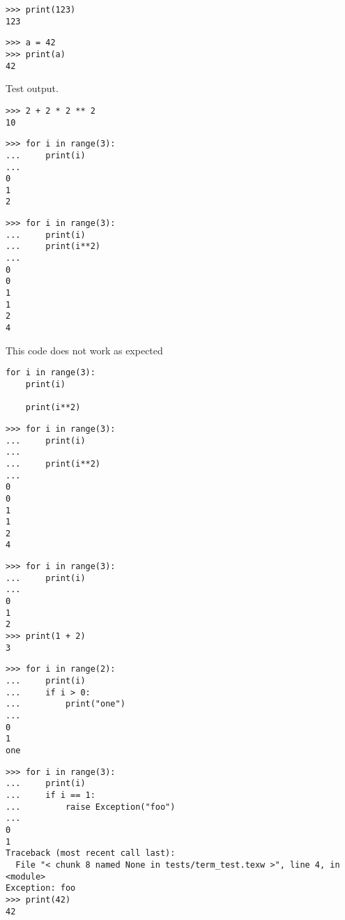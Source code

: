 
\begin{verbatim}
>>> print(123)
123

\end{verbatim}


\begin{verbatim}
>>> a = 42
>>> print(a)
42

\end{verbatim}

Test output.

\begin{verbatim}
>>> 2 + 2 * 2 ** 2
10

\end{verbatim}


\begin{verbatim}
>>> for i in range(3):
...     print(i)
...
0
1
2

\end{verbatim}


\begin{verbatim}
>>> for i in range(3):
...     print(i)
...     print(i**2)
...
0
0
1
1
2
4

\end{verbatim}

This code does not work as expected
\begin{verbatim}
for i in range(3):
    print(i)

    print(i**2)
\end{verbatim}


\begin{verbatim}
>>> for i in range(3):
...     print(i)
...
...     print(i**2)
...
0
0
1
1
2
4

\end{verbatim}


\begin{verbatim}
>>> for i in range(3):
...     print(i)
...
0
1
2
>>> print(1 + 2)
3

\end{verbatim}


\begin{verbatim}
>>> for i in range(2):
...     print(i)
...     if i > 0:
...         print("one")
...
0
1
one

\end{verbatim}


\begin{verbatim}
>>> for i in range(3):
...     print(i)
...     if i == 1:
...         raise Exception("foo")
...
0
1
Traceback (most recent call last):
  File "< chunk 8 named None in tests/term_test.texw >", line 4, in
<module>
Exception: foo
>>> print(42)
42

\end{verbatim}


